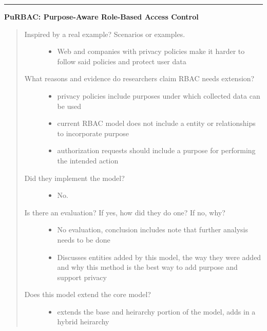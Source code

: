 \documentclass[letterpaper,10pt,english]{sphinxmanual}
\begin{document}
\bigskip\hrule{}\bigskip


\textbf{PuRBAC: Purpose-Aware Role-Based Access Control}
\begin{quote}
\begin{description}
\item[{Inspired by a real example? Scenarios or examples.}] \leavevmode\begin{itemize}
\item {} 
Web and companies with privacy policies make it harder to follow said policies and protect user data

\end{itemize}

\item[{What reasons and evidence do researchers claim RBAC needs extension?}] \leavevmode\begin{itemize}
\item {} 
privacy policies include purposes under which collected data can be used

\item {} 
current RBAC model does not include a entity or relationships to incorporate purpose

\item {} 
authorization requests should include a purpose for performing the intended action

\end{itemize}

\item[{Did they implement the model?}] \leavevmode\begin{itemize}
\item {} 
No.

\end{itemize}

\item[{Is there an evaluation? If yes, how did they do one? If no, why?}] \leavevmode\begin{itemize}
\item {} 
No evaluation, conclusion includes note that further analysis needs to be done

\item {} 
Discusses entities added by this model, the way they were added and why this method is the best way to add purpose and support privacy

\end{itemize}

\item[{Does this model extend the core model?}] \leavevmode\begin{itemize}
\item {} 
extends the base and heirarchy portion of the model, adds in a hybrid heirarchy


\end{itemize}
\end{description}
\end{quote}
\end{document}
